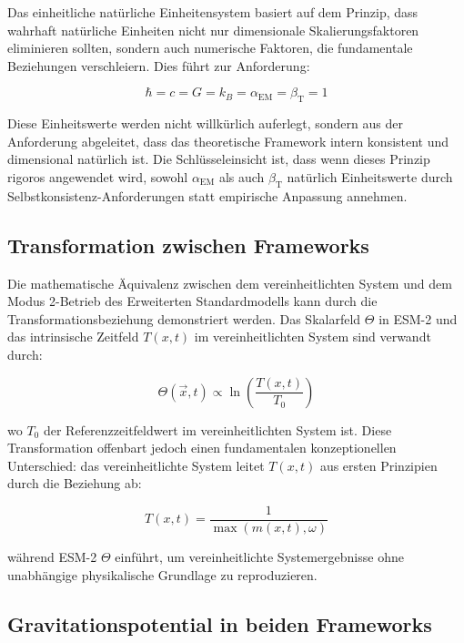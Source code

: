 \documentclass[12pt,a4paper]{article}
\newcommand{\Tfieldt}{T(x,t)}
\newcommand{\alphaEM}{\alpha_{\text{EM}}}
\newcommand{\betaT}{\beta_{\text{T}}}
\newcommand{\Tzero}{T_0}
\newcommand{\vecx}{\vec{x}}
\begin{document}
	Das einheitliche natürliche Einheitensystem basiert auf dem Prinzip, dass wahrhaft natürliche Einheiten nicht nur dimensionale Skalierungsfaktoren eliminieren sollten, sondern auch numerische Faktoren, die fundamentale Beziehungen verschleiern. Dies führt zur Anforderung:
	
	\begin{equation}
		\hbar = c = G = k_B = \alphaEM = \betaT = 1
	\end{equation}
	
	Diese Einheitswerte werden nicht willkürlich auferlegt, sondern aus der Anforderung abgeleitet, dass das theoretische Framework intern konsistent und dimensional natürlich ist. Die Schlüsseleinsicht ist, dass wenn dieses Prinzip rigoros angewendet wird, sowohl $\alphaEM$ als auch $\betaT$ natürlich Einheitswerte durch Selbstkonsistenz-Anforderungen statt empirische Anpassung annehmen.
	
	\subsection{Transformation zwischen Frameworks}
	\label{subsec:transformation}
	
	Die mathematische Äquivalenz zwischen dem vereinheitlichten System und dem Modus 2-Betrieb des Erweiterten Standardmodells kann durch die Transformationsbeziehung demonstriert werden. Das Skalarfeld $\Theta$ in ESM-2 und das intrinsische Zeitfeld $\Tfieldt$ im vereinheitlichten System sind verwandt durch:
	
	\begin{equation}
		\Theta(\vecx,t) \propto \ln\left(\frac{\Tfieldt}{\Tzero}\right)
	\end{equation}
	
	wo $\Tzero$ der Referenzzeitfeldwert im vereinheitlichten System ist. Diese Transformation offenbart jedoch einen fundamentalen konzeptionellen Unterschied: das vereinheitlichte System leitet $\Tfieldt$ aus ersten Prinzipien durch die Beziehung ab:
	
	\begin{equation}
		\Tfieldt = \frac{1}{\max(m(x,t), \omega)}
	\end{equation}
	
	während ESM-2 $\Theta$ einführt, um vereinheitlichte Systemergebnisse ohne unabhängige physikalische Grundlage zu reproduzieren.
	
	\subsection{Gravitationspotential in beiden Frameworks}
	\label{subsec:gravitational_potential}
	
\end{document}
